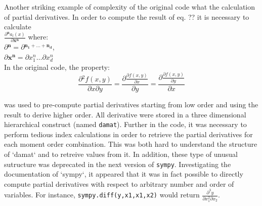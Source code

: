 \documentclass[11pt,a4paper]{article}
\newcommand{\sympy}{\texttt{sympy}}
\begin{document}
Another striking example of complexity of the original code what the calculation of partial derivatives.
In order to compute the result of eq. ??\cite{ale_general_2013} it is necessary to calculate\\
$\frac{\partial{}^\mathbf{n} a_l(x)}{\partial{}\mathbf{x^n}}$
where:\\
$\partial{}^\mathbf{n} = \partial{}^\mathbf{n_1+\dots{}+n_d} $,\\
$\partial{} \mathbf{x^n} = \partial{} x^n_1 \dots{} \partial x^n_d $\\

In the original code, the property: 
\begin{equation}
\frac{\partial{} ^ 2 f(x,y)}{\partial x \partial y} =
\frac{\partial{} \frac{\partial{} f(x,y)}{\partial x}}{\partial y} =
\frac{\partial{} \frac{\partial{} f(x,y)}{\partial{} y}}{\partial{} x}
\end{equation}

was used to pre-compute partial derivatives starting from low order and using the result to derive higher order.
All derivative were stored in a three dimensional hierarchical construct (named \texttt{damat}).
Further in the code, it was necessary to perform  tedious index calculations in order to 
retrieve the partial derivatives for each moment order combination.
This was both hard to understand the structure of `damat` and to retreive values from it. 
In addition, these type of unusual sutructure was deprecated in the next version of \sympy{}.
Investigating the documentation of `sympy`, it appeared that it was in fact possible to directly compute partial derivatives
with respect to arbitrary number and order of variables.
For instance, \texttt{sympy.diff(y,x1,x1,x2)} would return $\frac{\partial^3 y}{\partial x_1^2 \partial x_2}$.
\end{document}

